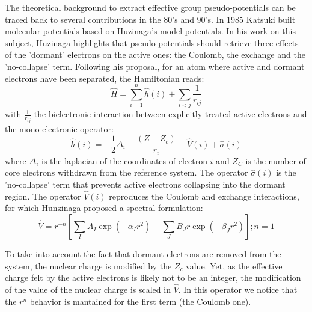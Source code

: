 \documentclass[journal=jctcce,manuscript=article]{achemso}
\begin{document}
The theoretical background to extract effective group pseudo-potentials  can be traced back 
to several contributions in the 80's and 90's. In 1985 Katsuki built molecular potentials based on Huzinaga's model potentials.
 In his work on this subject, Huzinaga highlights that pseudo-potentials should retrieve three effects of the
'dormant' electrons on the active ones: the Coulomb, the exchange and the 'no-collapse' term.\cite{huzinaga_effective_1991}
Following his proposal, for an atom where active and dormant electrons have been separated, the Hamiltonian reads:
\begin{equation}
\label{eq:atomicHamiltonian}
\hat{H} = \sum_{i=1}^n \hat{h}(i) +\sum_{i<j}\frac{1}{r_{ij}}
\end{equation}
with $\frac{1}{r_{ij}}$ the bielectronic interaction
between explicitly treated active electrons and
the mono electronic operator:
\begin{equation}
\label{eq:monoElectronicOperator}
\hat{h}(i) = -\frac{1}{2}\Delta_i - \frac{(Z-Z_c)}{r_i}+\hat{V}(i) + \hat{\sigma}(i)
\end{equation}
where
$\Delta_i$ is the laplacian of the coordinates of electron $i$ and 
$Z_C$ is the number of core electrons withdrawn from the reference system.
The operator $\hat{\sigma}(i)$ is the 'no-collapse' term that prevents active electrons
collapsing into the dormant region. The operator $\hat{V}(i)$ reproduces the 
Coulomb and exchange interactions, for which Hunzinaga proposed a spectral formulation:
\begin{equation}
\label{eq:HuzinagaMPVersion1Potential}
\hat{V} = r^{-n}\left[\sum_IA_I\exp(-\alpha_I r^2)+\sum_JB_Jr\exp(-\beta_J r^2)\right];  n=1
\end{equation}

To take into account the fact that dormant electrons are removed from the
system, the nuclear charge is modified by the $Z_c$ value.
Yet, as the effective charge felt by the active electrons is likely not to be an integer,
the modification of the value of the nuclear charge is scaled in $\hat{V}$.
In this operator we notice that the \(r^{n}\) behavior is mantained for the first term 
(the Coulomb one).
\end{document}
